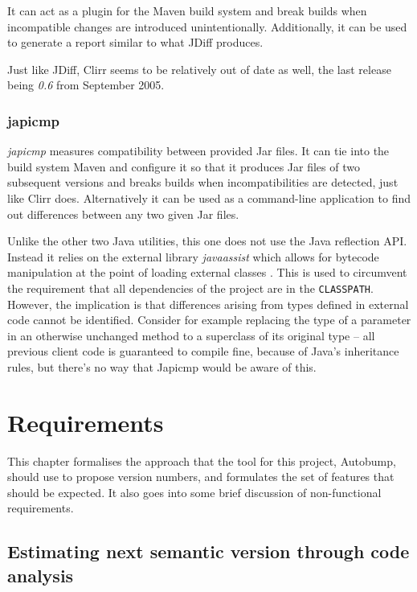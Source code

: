 \documentclass{l4proj}
\newcommand\genericstyle{\lstset{basicstyle=\ttm}}
\newcommand\codeinline[1]{{\genericstyle\lstinline!#1!}}
\begin{document}
It can act as a plugin for the Maven build system and break builds
when incompatible changes are introduced unintentionally.
Additionally, it can be used to generate a report similar to what
JDiff produces.

Just like JDiff, Clirr seems to be relatively out of date as well, the
last release being  \textit{0.6} from September 2005.

\subsection{japicmp}

\textit{japicmp} \cite{Japicmp} measures compatibility between
provided Jar files. It can tie into the build system Maven and
configure it so that it produces Jar files of two subsequent versions
and breaks builds when incompatibilities are detected, just like Clirr
does. Alternatively it can be used as a command-line application to
find out differences between any two given Jar files.

Unlike the other two Java utilities, this one does not use the Java
reflection API. Instead it relies on the external library
\textit{javaassist} \cite{JavaAssist} which allows for bytecode
manipulation at the point of loading external classes
\cite{BytecodeManip}. This is used to circumvent the requirement that
all dependencies of the project are in the \codeinline{CLASSPATH}.
However, the implication is that differences arising from types
defined in external code cannot be identified. Consider for example
replacing the type of a parameter in an otherwise unchanged method to
a superclass of its original type -- all previous client code is
guaranteed to compile fine, because of Java's inheritance rules, but
there's no way that Japicmp would be aware of this.

\chapter{Requirements}
\label{Requirements}

This chapter formalises the approach that the tool for this project,
Autobump, should use to propose version numbers, and formulates the
set of features that should be expected. It also goes into some brief
discussion of non-functional requirements.

\section{Estimating next semantic version through code analysis}
\label{EstimatingNextSemver}
\end{document}
